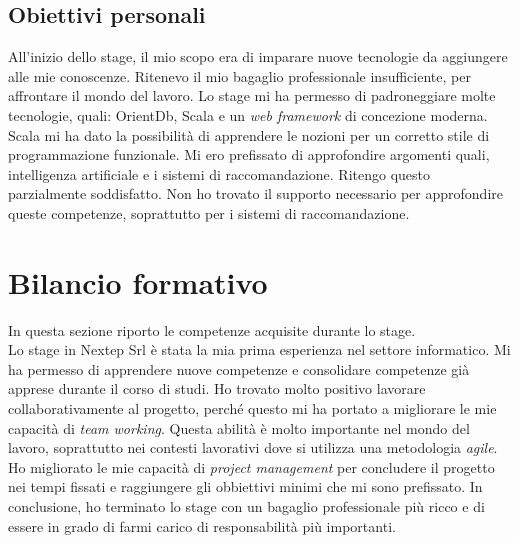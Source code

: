 \subsection{Obiettivi personali}
All'inizio dello stage, il mio scopo era di imparare nuove tecnologie da aggiungere alle mie conoscenze. Ritenevo il mio bagaglio professionale insufficiente, per affrontare il mondo del lavoro. Lo stage mi ha permesso di padroneggiare molte tecnologie, quali: OrientDb, Scala e un \emph{web framework} di concezione moderna. Scala mi ha dato la possibilità di apprendere le nozioni per un corretto stile di programmazione funzionale. Mi ero prefissato di approfondire argomenti quali, intelligenza artificiale e i sistemi di raccomandazione. Ritengo questo parzialmente soddisfatto. Non ho trovato il supporto necessario per approfondire queste competenze, soprattutto per i sistemi di raccomandazione.




\section{Bilancio formativo}
In questa sezione riporto le competenze acquisite durante lo stage.\\
Lo stage in Nextep Srl è stata la  mia prima esperienza nel settore informatico. Mi ha permesso di apprendere nuove competenze e consolidare competenze già apprese durante il corso di studi.
Ho trovato molto positivo lavorare collaborativamente al progetto, perché questo mi ha portato a migliorare le mie capacità di \emph{team working}. Questa abilità è molto importante nel mondo del lavoro, soprattutto nei contesti lavorativi dove si utilizza una metodologia \emph{agile}. Ho migliorato le mie capacità di \emph{project management} per concludere il progetto nei tempi fissati e raggiungere gli obbiettivi minimi che mi sono prefissato. In conclusione, ho terminato lo stage con un bagaglio professionale più ricco e di essere in grado di farmi carico di responsabilità più importanti.
\newpage
